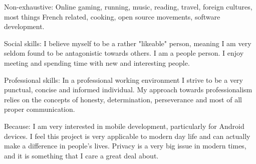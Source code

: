\spacedhrule{1.6em}{-0.4em}

\inlineheadsection
  {Non-exhaustive:}
  {Online gaming, running, music, reading, travel, foreign cultures, most things French related, cooking, open source movements, software development.}

  
\spacedhrule{1.6em}{-0.4em}  
  

\inlineheadsection
  {Social skills:}
  {I believe myself to be a rather "likeable" person, meaning I am very seldom found to be antagonistic towards others. I am a people person. I enjoy meeting and spending time with new and interesting people.}
  
\inlineheadsection
  {Professional skills:}
  {In a professional working environment I strive to be a very punctual, concise and informed individual. My approach towards professionalism relies on the concepts of honesty, determination, perseverance and most of all proper communication.}
  
\spacedhrule{1.6em}{-0.4em}  
  

\inlineheadsection
  {Because:}
  {I am very interested in mobile development, particularly for Android devices. I feel this project is very applicable to modern day life and can actually make a difference in people's lives. Privacy is a very big issue in modern times, and it is something that I care a great deal about.}